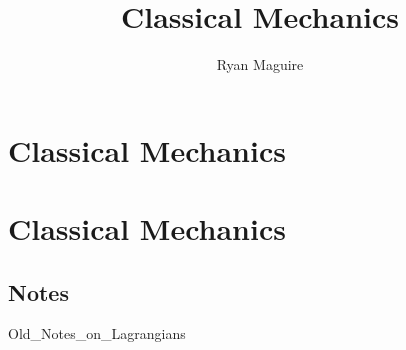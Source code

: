 \documentclass[crop=false,class=book,oneside]{standalone}
\begin{document}
    \newif\ifclassicmech
    \ifx\ifphysics\undefined
        \title{Classical Mechanics}
        \author{Ryan Maguire}
        \date{\vspace{-5ex}}
        \maketitle
        \tableofcontents
        \chapter*{Classical Mechanics}
        \setcounter{chapter}{1}
    \else
        \chapter{Classical Mechanics}
    \fi
    \section{Notes}
        {Old_Notes_on_Lagrangians}
\end{document}

